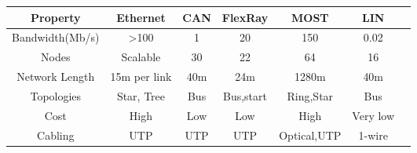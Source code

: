 \begin{center}
\begin{tabular}{|c|c|c|c|c|c|c}
\hline
\textbf{Property} & \textbf{Ethernet} & \textbf{CAN} & \textbf{FlexRay} & \textbf{MOST} & \textbf{LIN}\\
\hline
Bandwidth(Mb/s) & \textgreater 100 & 1 & 20 & 150 & 0.02\\
\hline
Nodes & Scalable & 30 & 22 & 64 & 16\\
\hline
Network Length & 15m per link & 40m & 24m & 1280m & 40m\\
\hline
Topologies & Star, Tree & Bus& Bus,start & Ring,Star & Bus\\
\hline
Cost & High& Low& Low& High& Very low\\
\hline
Cabling & UTP & UTP & UTP & Optical,UTP & 1-wire\\

\hline
\end{tabular}
\label{tab:Comparison_Automotive_Networks}
\end{center}
